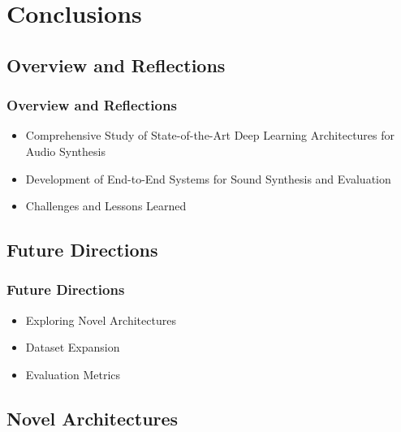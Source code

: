 \section{Conclusions}

\subsection{Overview and Reflections}

\begin{frame}
    \frametitle{Overview and Reflections}
    \begin{itemize}
        \item Comprehensive Study of State-of-the-Art Deep Learning Architectures for Audio Synthesis
        \item Development of End-to-End Systems for Sound Synthesis and Evaluation
        \item Challenges and Lessons Learned
    \end{itemize}
\end{frame}

\subsection{Future Directions}

\begin{frame}
    \frametitle{Future Directions}
    \begin{itemize}
        \item Exploring Novel Architectures
        \item Dataset Expansion
        \item Evaluation Metrics
    \end{itemize}
\end{frame}

\subsection{Novel Architectures}


